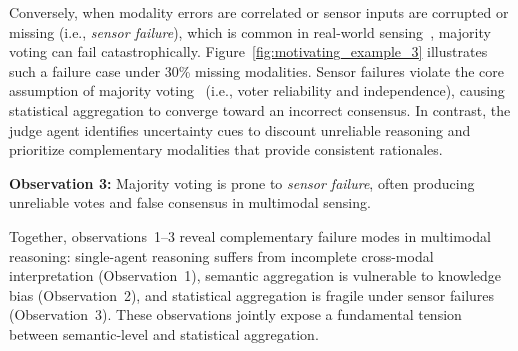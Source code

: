 Conversely, when modality errors are correlated or sensor inputs are corrupted or missing (i.e., \textit{sensor failure}), which is common in real-world sensing~\citep{missing_data}, majority voting can fail catastrophically. Figure~\ref{fig:motivating_example_3} illustrates such a failure case under 30\% missing modalities. Sensor failures violate the core assumption of majority voting~\citep{cjt} (i.e., voter reliability and independence), causing statistical aggregation to converge toward an incorrect consensus. In contrast, the judge agent identifies uncertainty cues to discount unreliable reasoning and prioritize complementary modalities that provide consistent rationales.

\begin{observationbox}
    \noindent \textbf{Observation 3:} Majority voting is prone to \textit{sensor failure}, often producing unreliable votes and false consensus in multimodal sensing.
\end{observationbox}

Together, observations~1--3 reveal complementary failure modes in multimodal reasoning: single-agent reasoning suffers from incomplete cross-modal interpretation (Observation~1), semantic aggregation is vulnerable to knowledge bias (Observation~2), and statistical aggregation is fragile under sensor failures (Observation~3). These observations jointly expose a fundamental tension between semantic-level and statistical aggregation.

